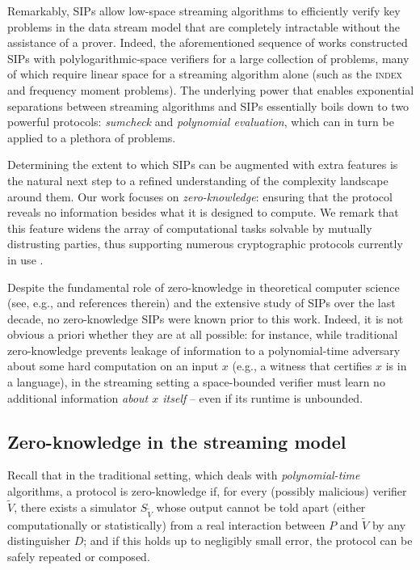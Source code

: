 \documentclass[10pt,a4paper]{article}
\theoremstyle{definition}
\newcommand{\indexproblem}{\normalfont\textsc{index}\xspace}
\begin{document}
Remarkably, SIPs allow low-space streaming algorithms to efficiently verify key problems in the data stream model that are completely intractable without the assistance of a prover. Indeed, the aforementioned sequence of works constructed SIPs with polylogarithmic-space verifiers for a large collection of problems, many of which require linear space for a streaming algorithm alone (such as the \indexproblem and frequency moment problems). The underlying power that enables exponential separations between streaming algorithms and SIPs essentially boils down to two powerful protocols: \emph{sumcheck} and \emph{polynomial evaluation}, which can in turn be applied to a plethora of problems.

Determining the extent to which SIPs can be augmented with extra features is the natural next step to a refined understanding of the complexity landscape around them. Our work focuses on \emph{zero-knowledge}: ensuring that the protocol reveals no information besides what it is designed to compute. We remark that this feature widens the array of computational tasks solvable by mutually distrusting parties, thus supporting numerous cryptographic protocols currently in use \cite{BCGGMTV14,BBHR18,BCRSVW19}.

Despite the fundamental role of zero-knowledge in theoretical computer science (see, e.g., \cite{V99, G02, V07, G08} and references therein) and the extensive study of SIPs over the last decade, no zero-knowledge SIPs were known prior to this work. Indeed, it is not obvious a priori whether they are at all possible: for instance, while traditional zero-knowledge prevents leakage of information to a polynomial-time adversary about some hard computation on an input $x$ (e.g., a witness that certifies $x$ is in a language), in the streaming setting a space-bounded verifier must learn no additional information \emph{about $x$ itself} -- even if its runtime is unbounded.            


\subsection{Zero-knowledge in the streaming model}
Recall that in the traditional setting, which deals with \emph{polynomial-time} algorithms, a protocol is zero-knowledge if, for every (possibly malicious) verifier $\widetilde V$, there exists a simulator $S_{\widetilde V}$ whose output cannot be told apart (either computationally or statistically) from a real interaction between $P$ and $\widetilde V$ by any distinguisher $D$; and if this holds up to negligibly small error, the protocol can be safely repeated or composed.
\end{document}
